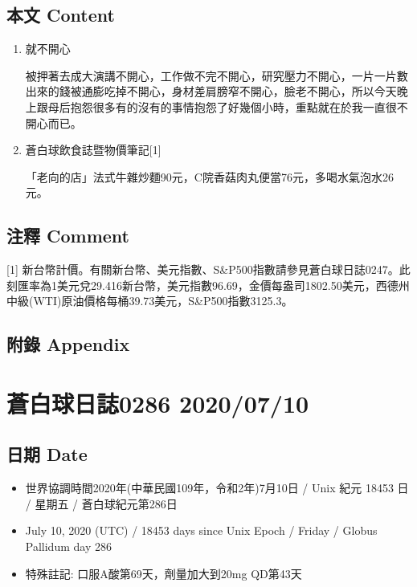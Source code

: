 \documentclass[a5paper, 11pt
]{book}
\providecommand{\tightlist}{%
  \setlength{\itemsep}{0pt}\setlength{\parskip}{0pt}}
\begin{document}
\hypertarget{ux672cux6587-content-34}{%
\subsection{本文 Content}\label{ux672cux6587-content-34}}

\begin{enumerate}
\def\labelenumi{\arabic{enumi}.}
\item
  就不開心

  被押著去成大演講不開心，工作做不完不開心，研究壓力不開心，一片一片數出來的錢被通膨吃掉不開心，身材差肩膀窄不開心，臉老不開心，所以今天晚上跟母后抱怨很多有的沒有的事情抱怨了好幾個小時，重點就在於我一直很不開心而已。
\item
  蒼白球飲食誌暨物價筆記{[}1{]}

  「老向的店」法式牛雜炒麵90元，C院香菇肉丸便當76元，多喝水氣泡水26元。
\end{enumerate}

\hypertarget{ux6ce8ux91cb-comment-34}{%
\subsection{注釋 Comment}\label{ux6ce8ux91cb-comment-34}}

{[}1{]}
新台幣計價。有關新台幣、美元指數、S\&P500指數請參見蒼白球日誌0247。此刻匯率為1美元兌29.416新台幣，美元指數96.69，金價每盎司1802.50美元，西德州中級(WTI)原油價格每桶39.73美元，S\&P500指數3125.3。

\hypertarget{ux9644ux9304-appendix-34}{%
\subsection{附錄 Appendix}\label{ux9644ux9304-appendix-34}}

\hypertarget{ux84bcux767dux7403ux65e5ux8a8c0286-20200710}{%
\section{蒼白球日誌0286
2020/07/10}\label{ux84bcux767dux7403ux65e5ux8a8c0286-20200710}}

\hypertarget{ux65e5ux671f-date-35}{%
\subsection{日期 Date}\label{ux65e5ux671f-date-35}}

\begin{itemize}
\tightlist
\item
  世界協調時間2020年(中華民國109年，令和2年)7月10日 / Unix 紀元 18453 日
  / 星期五 / 蒼白球紀元第286日
\item
  July 10, 2020 (UTC) / 18453 days since Unix Epoch / Friday / Globus
  Pallidum day 286
\item
  特殊註記: 口服A酸第69天，劑量加大到20mg QD第43天
\end{itemize}
\end{document}
